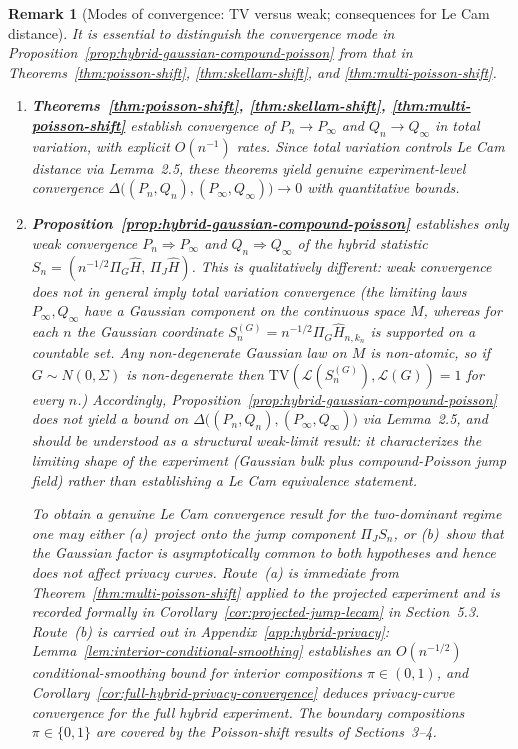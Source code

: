 \documentclass{article}
\newtheorem{remark}[theorem]{Remark}
\begin{document}
\begin{remark}[Modes of convergence: TV versus weak; consequences for Le Cam distance]
\label{rem:convergence-modes}
It is essential to distinguish the convergence mode in Proposition~\ref{prop:hybrid-gaussian-compound-poisson}
from that in Theorems~\ref{thm:poisson-shift}, \ref{thm:skellam-shift}, and \ref{thm:multi-poisson-shift}.

\begin{enumerate}
\item[(i)] \textbf{Theorems~\ref{thm:poisson-shift}, \ref{thm:skellam-shift}, \ref{thm:multi-poisson-shift}}
establish convergence of $P_n \to P_\infty$ and $Q_n \to Q_\infty$ in \emph{total variation},
with explicit $O(n^{-1})$ rates. Since total variation controls Le Cam distance via Lemma~2.5,
these theorems yield genuine experiment-level convergence
$\Delta\bigl((P_n,Q_n),(P_\infty,Q_\infty)\bigr)\to 0$ with quantitative bounds.

\item[(ii)] \textbf{Proposition~\ref{prop:hybrid-gaussian-compound-poisson}} establishes only
\emph{weak convergence} $P_n\Rightarrow P_\infty$ and $Q_n\Rightarrow Q_\infty$ of the hybrid
statistic $S_n=(n^{-1/2}\Pi_G\widehat H,\,\Pi_J\widehat H)$. This is qualitatively different:
weak convergence does \emph{not} in general imply total variation convergence (the limiting laws
$P_\infty,Q_\infty$ have a Gaussian component on the continuous space $M$, whereas for each $n$
the Gaussian coordinate $S_n^{(G)}=n^{-1/2}\Pi_G\widehat H_{n,k_n}$ is supported on a countable set.
Any non-degenerate Gaussian law on $M$ is non-atomic, so if $G\sim N(0,\Sigma)$ is non-degenerate then
$\mathrm{TV}(\mathcal L(S_n^{(G)}),\mathcal L(G))=1$ for every $n$.) Accordingly,
Proposition~\ref{prop:hybrid-gaussian-compound-poisson} does \emph{not} yield a bound on
$\Delta\bigl((P_n,Q_n),(P_\infty,Q_\infty)\bigr)$ via Lemma~2.5, and should be understood as a
\emph{structural weak-limit result}: it characterizes the limiting \emph{shape} of the experiment
(Gaussian bulk plus compound-Poisson jump field) rather than establishing a Le Cam equivalence
statement.

To obtain a genuine Le Cam convergence result for the two-dominant regime one may either
(a)~project onto the jump component $\Pi_J S_n$, or (b)~show that the Gaussian factor is 
asymptotically common to both hypotheses and hence does not affect privacy curves.
Route~(a) is immediate from Theorem~\ref{thm:multi-poisson-shift}
applied to the projected experiment and is recorded formally in
Corollary~\ref{cor:projected-jump-lecam} in Section~5.3.
Route~(b) is carried out in Appendix~\ref{app:hybrid-privacy}: 
Lemma~\ref{lem:interior-conditional-smoothing} establishes an $O(n^{-1/2})$ 
conditional-smoothing bound for interior compositions $\pi\in(0,1)$, and 
Corollary~\ref{cor:full-hybrid-privacy-convergence} deduces privacy-curve convergence 
for the full hybrid experiment. The boundary compositions $\pi\in\{0,1\}$ are covered 
by the Poisson-shift results of Sections~3--4.
\end{enumerate}
\end{remark}
\end{document}
